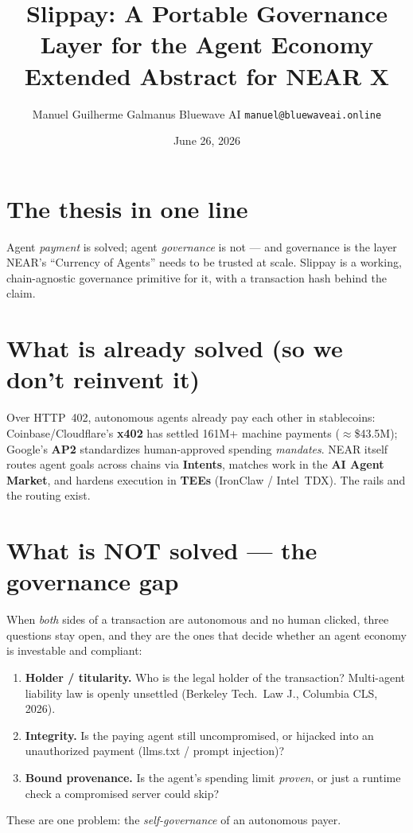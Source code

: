 \documentclass[11pt]{article}
\title{\textbf{Slippay: A Portable Governance Layer for the Agent Economy}\\[2pt]
\large Extended Abstract for NEAR X}
\author{Manuel Guilherme Galmanus \;\textbar\; Bluewave AI \;\textbar\; \texttt{manuel@bluewaveai.online}}
\date{June 26, 2026}
\begin{document}
\maketitle
\thispagestyle{fancy}
\vspace{-1.2em}

\section*{The thesis in one line}
Agent \emph{payment} is solved; agent \emph{governance} is not --- and governance is the layer
NEAR's ``Currency of Agents'' needs to be trusted at scale. Slippay is a working, chain-agnostic
governance primitive for it, with a transaction hash behind the claim.

\section*{What is already solved (so we don't reinvent it)}
Over HTTP~402, autonomous agents already pay each other in stablecoins: Coinbase/Cloudflare's
\textbf{x402} has settled 161M+ machine payments ($\approx$\$43.5M); Google's \textbf{AP2}
standardizes human-approved spending \emph{mandates}. NEAR itself routes agent goals across
chains via \textbf{Intents}, matches work in the \textbf{AI Agent Market}, and hardens execution
in \textbf{TEEs} (IronClaw / Intel~TDX). The rails and the routing exist.

\section*{What is NOT solved --- the governance gap}
When \emph{both} sides of a transaction are autonomous and no human clicked, three questions stay
open, and they are the ones that decide whether an agent economy is investable and compliant:
\begin{enumerate}
  \item \textbf{Holder / titularity.} Who is the legal holder of the transaction? Multi-agent
  liability law is openly unsettled (Berkeley Tech.\ Law J., Columbia CLS, 2026).
  \item \textbf{Integrity.} Is the paying agent still uncompromised, or hijacked into an
  unauthorized payment (llms.txt / prompt injection)?
  \item \textbf{Bound provenance.} Is the agent's spending limit \emph{proven}, or just a
  runtime check a compromised server could skip?
\end{enumerate}
These are one problem: the \emph{self-governance} of an autonomous payer.
\end{document}
